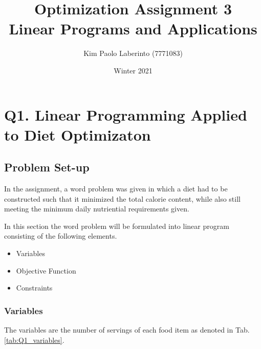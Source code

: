 \documentclass{article}
\title{Optimization Assignment 3\\Linear Programs and Applications}
\date{Winter 2021}
\author{Kim Paolo Laberinto (7771083)}
\begin{document}
    \maketitle
    \newpage

    \tableofcontents
    \newpage


    \section{Q1. Linear Programming Applied to Diet Optimizaton}

    \subsection{Problem Set-up}

    In the assignment, a word problem was given in which a diet had to be constructed such that it minimized the total calorie content, while also still meeting the minimum daily nutriential requirements given.

    In this section the word problem will be formulated into linear program consisting of the following elements.
    \begin{itemize}
        \item Variables
        \item Objective Function
        \item Constraints
    \end{itemize}

    \subsubsection{Variables}

    The variables are the number of servings of each food item as denoted in Tab. \ref{tab:Q1_variables}.
\end{document}
